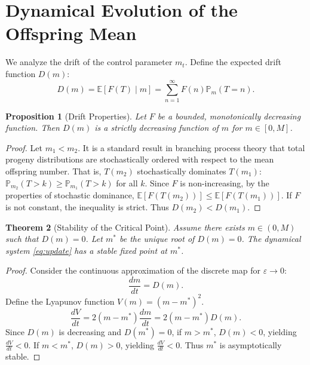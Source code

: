 \documentclass[11pt, a4paper]{article}
\newtheorem{theorem}{Theorem}[section]
\newtheorem{proposition}[theorem]{Proposition}
\theoremstyle{definition}
\newcommand{\E}{\mathbb{E}}
\renewcommand{\P}{\mathbb{P}}
\begin{document}
\section{Dynamical Evolution of the Offspring Mean}

We analyze the drift of the control parameter $m_t$. Define the expected drift function $D(m)$:
\begin{equation}
    D(m) = \E [F(T) \mid m] = \sum_{n=1}^{\infty} F(n) \P_m(T=n).
\end{equation}

\begin{proposition}[Drift Properties]
Let $F$ be a bounded, monotonically decreasing function. Then $D(m)$ is a strictly decreasing function of $m$ for $m \in [0, M]$.
\end{proposition}

\begin{proof}
Let $m_1 < m_2$. It is a standard result in branching process theory that total progeny distributions are stochastically ordered with respect to the mean offspring number. That is, $T(m_2)$ stochastically dominates $T(m_1)$: $\P_{m_2}(T > k) \ge \P_{m_1}(T > k)$ for all $k$.
Since $F$ is non-increasing, by the properties of stochastic dominance, $\E[F(T(m_2))] \le \E[F(T(m_1))]$. If $F$ is not constant, the inequality is strict. Thus $D(m_2) < D(m_1)$.
\end{proof}

\begin{theorem}[Stability of the Critical Point]
Assume there exists $m \in (0, M)$ such that $D(m)=0$. Let $m^*$ be the unique root of $D(m)=0$. The dynamical system \eqref{eq:update} has a stable fixed point at $m^*$.
\end{theorem}

\begin{proof}
Consider the continuous approximation of the discrete map for $\varepsilon \to 0$:
\begin{equation}
    \frac{dm}{dt} = D(m).
\end{equation}
Define the Lyapunov function $V(m) = (m - m^*)^2$.
\begin{equation}
    \frac{dV}{dt} = 2(m - m^*) \frac{dm}{dt} = 2(m - m^*) D(m).
\end{equation}
Since $D(m)$ is decreasing and $D(m^*) = 0$, if $m > m^*$, $D(m) < 0$, yielding $\frac{dV}{dt} < 0$. If $m < m^*$, $D(m) > 0$, yielding $\frac{dV}{dt} < 0$. Thus $m^*$ is asymptotically stable.
\end{proof}
\end{document}
